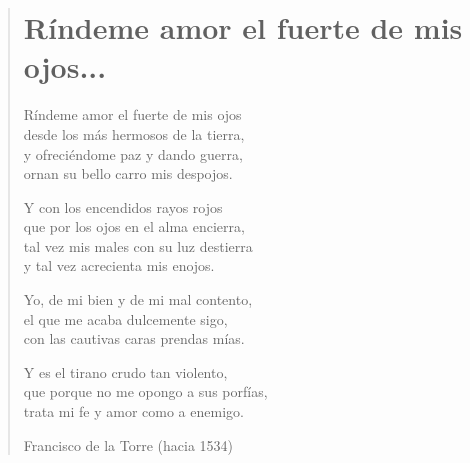 \documentclass[12pt, twoside]{book}
\begin{document}
\begin{verse}
\begin{center}
\section{Ríndeme amor el fuerte de mis ojos...}
\end{center}
Ríndeme amor el fuerte de mis ojos\\
desde los más hermosos de la tierra,\\
y ofreciéndome paz y dando guerra,\\
ornan su bello carro mis despojos.
\newline

Y con los encendidos rayos rojos\\
que por los ojos en el alma encierra,\\
tal vez mis males con su luz destierra\\
y tal vez acrecienta mis enojos.
\newline

Yo, de mi bien y de mi mal contento,\\
el que me acaba dulcemente sigo,\\
con las cautivas caras prendas mías.
\newline

Y es el tirano crudo tan violento,\\
que porque no me opongo a sus porfías,\\
trata mi fe y amor como a enemigo.
\newline

Francisco de la Torre (hacia 1534)
\end{verse}
\end{document}
